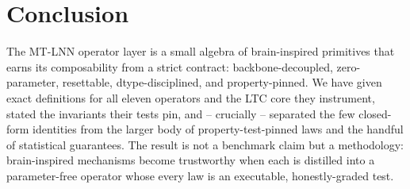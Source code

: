 \documentclass[11pt]{article}
\theoremstyle{definition}
\begin{document}
\section{Conclusion}
The MT-LNN operator layer is a small algebra of brain-inspired primitives
that earns its composability from a strict contract: backbone-decoupled,
zero-parameter, resettable, dtype-disciplined, and property-pinned. We have
given exact definitions for all eleven operators and the LTC core they
instrument, stated the invariants their tests pin, and -- crucially --
separated the few closed-form identities from the larger body of
property-test-pinned laws and the handful of statistical guarantees. The
result is not a benchmark claim but a methodology: brain-inspired mechanisms
become trustworthy when each is distilled into a parameter-free operator
whose every law is an executable, honestly-graded test.
\end{document}
